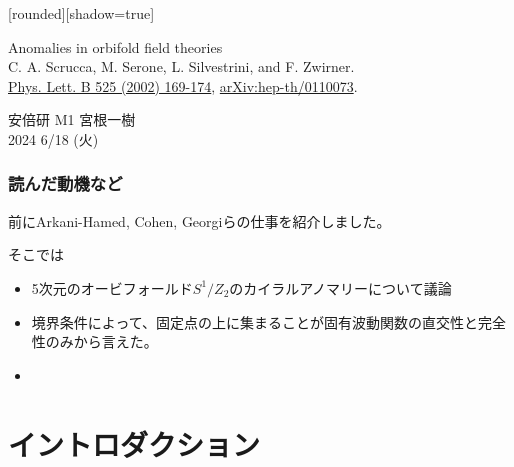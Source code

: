 \documentclass[
  unicode,a4paper,9pt,
  xcolor = {dvipsnames,svgnames},
  hyperref ={colorlinks=true,citecolor=Navy,linkcolor=NavyBlue,urlcolor=purple},
  ja=standard,lualatex
]{beamer}
\begin{document}
\begin{frame}

  [rounded][shadow=true]
  \begin{block}{}
    \vspace*{5pt}

    \centering\Large
    Anomalies in orbifold field theories
    \\
    \normalsize
    C. A. Scrucca, M. Serone, L. Silvestrini, and F. Zwirner.
    \\
    \small
    \href{https://doi.org/10.1016/S0370-2693(01)01430-7}{Phys. Lett. B 525 (2002) 169-174},
    \href{https://doi.org/10.48550/arXiv.hep-th/0110073}{arXiv:hep-th/0110073}.    

    \vspace*{5pt}
  \end{block}

  \begin{center}
    安倍研 M1 宮根一樹\\
    2024 6/18 (火)
  \end{center}

\end{frame}

\nocite{Scrucca:2001eb}

\begin{frame}
  \frametitle{読んだ動機など}

  前にArkani-Hamed, Cohen, Georgiらの仕事\cite{Arkani-Hamed:2001uol}を紹介しました。

  そこでは
  \begin{itemize}
    \item 
    5次元のオービフォールド$S^{1}/Z_{2}$のカイラルアノマリーについて議論
    \item 
    境界条件によって、固定点の上に集まることが固有波動関数の直交性と完全性のみから言えた。
    \item 
    
  \end{itemize}

  
\end{frame}


\section{イントロダクション}

\begin{frame}[plain]
  \huge \secname
\end{frame}
\end{document}
